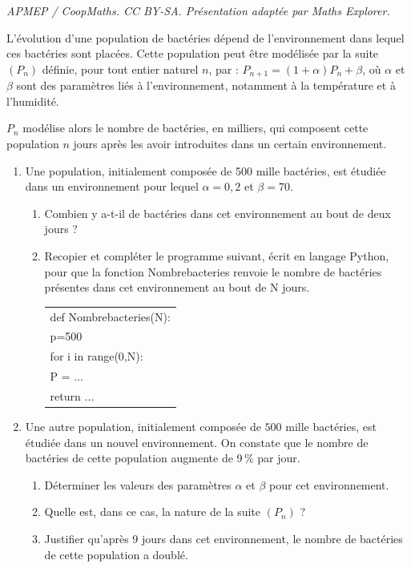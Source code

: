 \documentclass[10pt]{article}
\begin{document}
\noindent\textit{APMEP / CoopMaths. CC BY-SA. Présentation adaptée par Maths Explorer.}\par\medskip
\medskip

L'évolution d'une population de bactéries dépend de l'environnement dans lequel ces bactéries sont placées. Cette population peut être modélisée par la suite $(P_n)$ définie, pour tout entier naturel $n$, par : $P_{n+1}= (1+\alpha)P_n+\beta$, où $\alpha$ et $\beta$ sont des paramètres liés à l'environnement, notamment à la température et à l'humidité.

$P_n$ modélise alors le nombre de bactéries, en milliers, qui composent cette population $n$ jours après les avoir introduites dans un certain environnement.

\medskip

\begin{enumerate}
\item  Une population, initialement composée de 500 mille bactéries, est étudiée dans un
environnement pour lequel $\alpha=0,2$ et $\beta=70$.
\begin{enumerate}
\item  Combien y a-t-il de bactéries dans cet environnement au bout de deux jours ?
\item Recopier et compléter le programme suivant, écrit en langage Python, pour que la
fonction Nombrebacteries renvoie le nombre de bactéries présentes dans cet environnement au bout de N jours.

\begin{center}
\begin{tabular}[]{|l}
def Nombrebacteries(N):\\
	p=500\\
	for i in range(0,N):\\
	\phantom{xxx}		P = $\dots$\\
	return $\dots$\\
\end{tabular}
\end{center}
\end{enumerate}
\item Une autre population, initialement composée de $500$ mille bactéries, est étudiée dans un
nouvel environnement. On constate que le nombre de bactéries de cette population augmente de 9\,\% par jour.
	\begin{enumerate}
		\item Déterminer les valeurs des paramètres $\alpha$ et $\beta$ pour cet environnement.
		\item Quelle est, dans ce cas, la nature de la suite $\left(P_n\right)$ ?
		\item Justifier qu'après 9 jours dans cet environnement, le nombre de bactéries de cette population
a doublé.
	\end{enumerate}
\end{enumerate}
\vspace{0,5cm}
\end{document}
